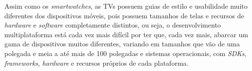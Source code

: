 Assim como os \textit{smartwatches}, as TVs possuem guias de estilo e usabilidade muito diferentes dos dispositivos móveis, pois possuem tamanhos de telas e recursos de \textit{hardware} e \textit{software} completamente 
distintos, ou seja, o desenvolvimento multiplataforma está cada vez mais difícil por ter que, cada vez mais, abarcar um gama de dispositivos muitos diferentes, variando em tamanhos que vão de uma polegada e meia a
até mais de 100 polegadas e sistemas operacionais, com \textit{SDKs}, \textit{frameworks}, \textit{hardware} e recursos próprios de cada plataforma. 